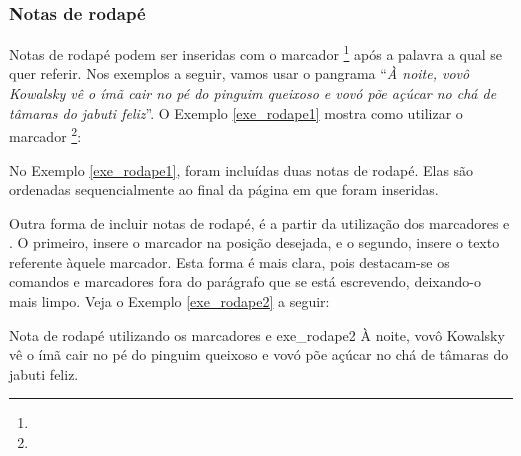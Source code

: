 \subsubsection*{Notas de rodapé}
\label{sec:notas_rodape}

Notas de rodapé podem ser inseridas com o marcador \texttt{\footnote{}} após a palavra a qual se quer referir. Nos exemplos a seguir, vamos usar o pangrama\footnotemark{} ``\textit{À noite, vovô Kowalsky vê o ímã cair no pé do pinguim queixoso e vovó põe açúcar no chá de tâmaras do jabuti feliz\footnotemark{}}''. O Exemplo \ref{exe_rodape1} mostra como utilizar o marcador \texttt{\footnote{}}:


\addtocounter{footnote}{-2}

No Exemplo \ref{exe_rodape1}, foram incluídas duas notas de rodapé. Elas são ordenadas sequencialmente ao final da página em que foram inseridas.

Outra forma de incluir notas de rodapé, é a partir da utilização dos marcadores \texttt{\footnotemark} e \texttt{\footnotetext}. O primeiro, insere o marcador na posição desejada, e o segundo, insere o texto referente àquele marcador. Esta forma é mais clara, pois destacam-se os comandos e marcadores fora do parágrafo que se está escrevendo, deixando-o mais limpo. Veja o Exemplo \ref{exe_rodape2} a seguir:

\begin{texexptitled}[breakable,enhanced,middle=2mm]{Nota de rodapé utilizando os marcadores \texttt{\footnotemark} e }{exe_rodape2}
À noite, vovô Kowalsky vê o ímã\footnotemark{} cair no pé do pinguim queixoso\footnotemark{} e vovó põe açúcar no chá de tâmaras do jabuti feliz.

\end{texexptitled}

